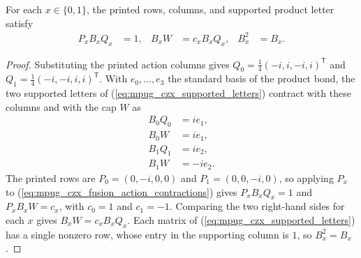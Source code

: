 \begin{lemma}
    \label{thm:mpug_czx_fusion_action_finite_identities}
    \leanok
    For each $x\in\{0,1\}$, the printed rows, columns, and supported
    product letter satisfy
    \begin{align}
        P_xB_xQ_x & =1, & B_xW & =c_xB_xQ_x, & B_x^2 & =B_x.
    \end{align}
\end{lemma}
\begin{proof}\leanok
    Substituting the printed action columns gives
    $Q_0=\tfrac14(-i,i,-i,i)^{\mathsf T}$ and
    $Q_1=\tfrac14(-i,-i,i,i)^{\mathsf T}$. With $e_0,\dots,e_3$ the standard
    basis of the product bond, the two supported letters of
    (\ref{eq:mpug_czx_supported_letters}) contract with these columns and
    with the cap $W$ as
    \begin{align}
        B_0Q_0 & =ie_1,  \\
        B_0W   & =ie_1,  \\
        B_1Q_1 & =ie_2,  \\
        B_1W   & =-ie_2.
        \label{eq:mpug_czx_fusion_action_contractions}
    \end{align}
    The printed rows are $P_0=(0,-i,0,0)$ and $P_1=(0,0,-i,0)$, so applying
    $P_x$ to (\ref{eq:mpug_czx_fusion_action_contractions}) gives
    $P_xB_xQ_x=1$ and $P_xB_xW=c_x$, with $c_0=1$ and $c_1=-1$. Comparing
    the two right-hand sides for each $x$ gives $B_xW=c_xB_xQ_x$. Each
    matrix of (\ref{eq:mpug_czx_supported_letters}) has a single nonzero row,
    whose entry in the supporting column is $1$, so $B_x^2=B_x$.
\end{proof}

